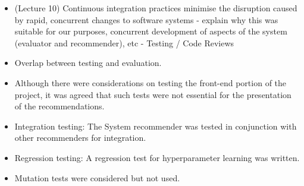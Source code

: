 \documentclass{l3proj}
\begin{document}






\begin{itemize}
\item (Lecture 10) Continuous integration practices minimise the disruption caused by rapid, concurrent changes to software systems - explain why this was suitable for our purposes, concurrent development of aspects of the system (evaluator and recommender), etc - Testing / Code Reviews
\item Overlap between testing and evaluation.
\item Although there were considerations on testing the front-end portion of the project, it was agreed that such tests were not essential for the presentation of the recommendations.
\item Integration testing: The System recommender was tested in conjunction with other recommenders for integration.
\item Regression testing: A regression test for hyperparameter learning was written.
\item Mutation tests were considered but not used.
\end{itemize}
\end{document}
